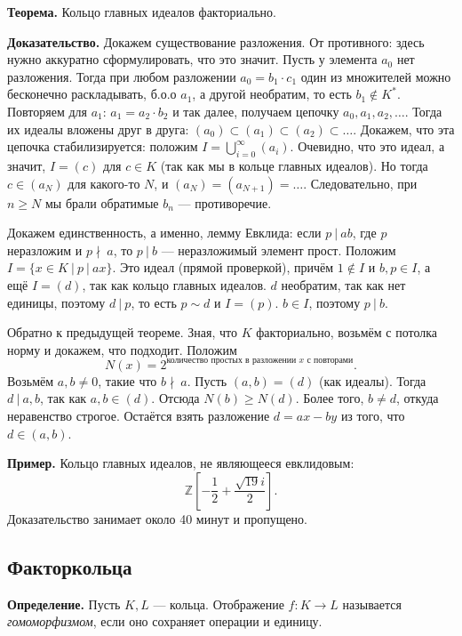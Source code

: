 \QED

\textbf{Теорема.} Кольцо главных идеалов факториально.

\textbf{Доказательство.} Докажем существование разложения.
От противного: здесь нужно аккуратно сформулировать, что это значит.
Пусть у элемента $a_0$ нет разложения.
Тогда при любом разложении $a_0 = b_1 \cdot c_1$ один из множителей можно бесконечно раскладывать, б.о.о $a_1$, а другой необратим, то есть $b_1 \not\in K^*$.
Повторяем для $a_1$: $a_1 = a_2 \cdot b_2$ и так далее, получаем цепочку $a_0, a_1, a_2, \dots$.
Тогда их идеалы вложены друг в друга: $(a_0) \subset (a_1) \subset (a_2) \subset \dots$.
Докажем, что эта цепочка стабилизируется: положим $I = \bigcup_{i=0}^{\infty} (a_i)$.
Очевидно, что это идеал, а значит, $I = (c)$ для $c \in K$ (так как мы в кольце главных идеалов).
Но тогда $c \in (a_N)$ для какого-то $N$, и $(a_{N}) = (a_{N+1}) = \dots$.
Следовательно, при $n \ge N$ мы брали обратимые $b_n$ --- противоречие.

Докажем единственность, а именно, лемму Евклида: если $p~|~ab$, где $p$ неразложим и $p \nmid~a$, то $p~|~b$ --- неразложимый элемент прост.
Положим $I = \{x \in K~|~p~|~ax\}$.
Это идеал (прямой проверкой), причём $1 \not\in I$ и $b, p \in I$, а ещё $I = (d)$, так как кольцо главных идеалов.
$d$ необратим, так как нет единицы, поэтому $d~|~p$, то есть $p \sim d$ и $I = (p)$.
$b \in I$, поэтому $p~|~b$.

\QED

Обратно к предыдущей теореме. Зная, что $K$ факториально, возьмём с потолка норму и докажем, что подходит.
Положим
\[
    N(x) = 2^{\text{количество простых в разложении $x$ с повторами}}.
\]
Возьмём $a, b \ne 0$, такие что $b\nmid~a$.
Пусть $(a, b) = (d)$ (как идеалы).
Тогда $d~|~a, b$, так как $a, b \in (d)$.
Отсюда $N(b) \ge N(d)$.
Более того, $b \ne d$, откуда неравенство строгое.
Остаётся взять разложение $d = ax - by$ из того, что $d \in (a, b)$.

\QED

\textbf{Пример.} Кольцо главных идеалов, не являющееся евклидовым:
\[
    \mathbb Z \left[ -\frac{1}{2} + \frac{\sqrt{19} i}{2} \right].
\]
Доказательство занимает около 40 минут и пропущено.

\subsection{Факторкольца}
\textbf{Определение.} Пусть $K, L$ --- кольца. Отображение $f: K \to L$ называется \textit{гомоморфизмом}, если оно сохраняет операции и единицу.

